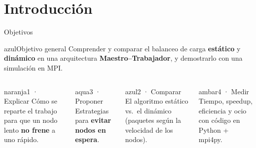 \documentclass[aspectratio=169,11pt,t]{beamer}
\begin{document}
\section{Introducción}
\begin{frame}{Objetivos}
\begin{tarjeta}[]{azul}{Objetivo general}\small 
Comprender y comparar el balanceo de carga \textbf{estático} y \textbf{dinámico} en una arquitectura
\textbf{Maestro–Trabajador}, y demostrarlo con una simulación en MPI.
\end{tarjeta}\vspace{2pt}
\begin{columns}[T,onlytextwidth]
\begin{tarjeta}[height=1.3cm]{naranja}{1 · Explicar}
Cómo se reparte el trabajo para que un nodo lento \textbf{no frene} a uno rápido.
\end{tarjeta}\vspace{4pt}
\begin{tarjeta}[height=1.3cm]{aqua}{3 · Proponer}
Estrategias para \textbf{evitar nodos en espera}.
\end{tarjeta}
\begin{tarjeta}[height=1.3cm]{azul}{2 · Comparar}
El algoritmo estático vs.\ el dinámico (paquetes según la velocidad de los nodos).
\end{tarjeta}\vspace{4pt}
\begin{tarjeta}[height=1.3cm]{ambar}{4 · Medir}
Tiempo, speedup, eficiencia y ocio con código en Python + mpi4py.
\end{tarjeta}
\end{columns}
\end{frame}
\end{document}
